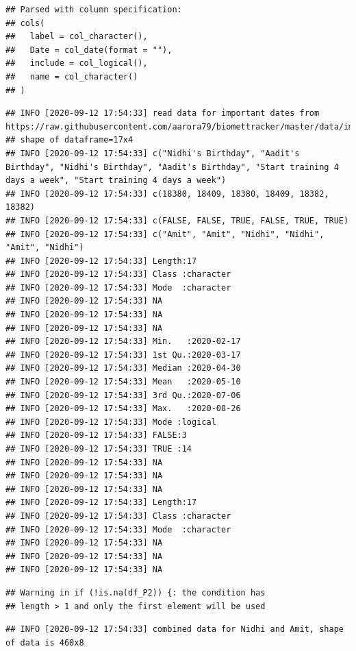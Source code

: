 \documentclass[oneside]{book}
\begin{document}
\begin{verbatim}
## Parsed with column specification:
## cols(
##   label = col_character(),
##   Date = col_date(format = ""),
##   include = col_logical(),
##   name = col_character()
## )
\end{verbatim}

\begin{verbatim}
## INFO [2020-09-12 17:54:33] read data for important dates from https://raw.githubusercontent.com/aarora79/biomettracker/master/data/important_dates.csv,
## shape of dataframe=17x4
## INFO [2020-09-12 17:54:33] c("Nidhi's Birthday", "Aadit's Birthday", "Nidhi's Birthday", "Aadit's Birthday", "Start training 4 days a week", "Start training 4 days a week")
## INFO [2020-09-12 17:54:33] c(18380, 18409, 18380, 18409, 18382, 18382)
## INFO [2020-09-12 17:54:33] c(FALSE, FALSE, TRUE, FALSE, TRUE, TRUE)
## INFO [2020-09-12 17:54:33] c("Amit", "Amit", "Nidhi", "Nidhi", "Amit", "Nidhi")
## INFO [2020-09-12 17:54:33] Length:17         
## INFO [2020-09-12 17:54:33] Class :character  
## INFO [2020-09-12 17:54:33] Mode  :character  
## INFO [2020-09-12 17:54:33] NA
## INFO [2020-09-12 17:54:33] NA
## INFO [2020-09-12 17:54:33] NA
## INFO [2020-09-12 17:54:33] Min.   :2020-02-17  
## INFO [2020-09-12 17:54:33] 1st Qu.:2020-03-17  
## INFO [2020-09-12 17:54:33] Median :2020-04-30  
## INFO [2020-09-12 17:54:33] Mean   :2020-05-10  
## INFO [2020-09-12 17:54:33] 3rd Qu.:2020-07-06  
## INFO [2020-09-12 17:54:33] Max.   :2020-08-26  
## INFO [2020-09-12 17:54:33] Mode :logical  
## INFO [2020-09-12 17:54:33] FALSE:3        
## INFO [2020-09-12 17:54:33] TRUE :14       
## INFO [2020-09-12 17:54:33] NA
## INFO [2020-09-12 17:54:33] NA
## INFO [2020-09-12 17:54:33] NA
## INFO [2020-09-12 17:54:33] Length:17         
## INFO [2020-09-12 17:54:33] Class :character  
## INFO [2020-09-12 17:54:33] Mode  :character  
## INFO [2020-09-12 17:54:33] NA
## INFO [2020-09-12 17:54:33] NA
## INFO [2020-09-12 17:54:33] NA
\end{verbatim}

\begin{verbatim}
## Warning in if (!is.na(df_P2)) {: the condition has
## length > 1 and only the first element will be used
\end{verbatim}

\begin{verbatim}
## INFO [2020-09-12 17:54:33] combined data for Nidhi and Amit, shape of data is 460x8
\end{verbatim}
\end{document}
